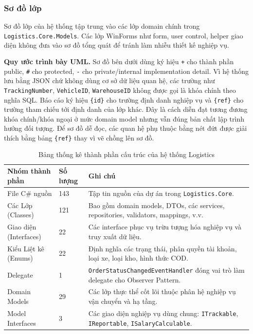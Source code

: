 \documentclass[12pt,a4paper]{article}
\begin{document}
\subsubsection{Sơ đồ lớp}

Sơ đồ lớp của hệ thống tập trung vào các lớp domain chính trong \texttt{Logistics.Core.Models}. Các lớp WinForms như form, user control, helper giao diện không đưa vào sơ đồ tổng quát để tránh làm nhiễu thiết kế nghiệp vụ.

\noindent\textbf{Quy ước trình bày UML.} Sơ đồ bên dưới dùng ký hiệu \texttt{+} cho thành phần public, \texttt{\#} cho protected, \texttt{-} cho private/internal implementation detail. Vì hệ thống lưu bằng JSON chứ không dùng cơ sở dữ liệu quan hệ, các trường như \texttt{TrackingNumber}, \texttt{VehicleID}, \texttt{WarehouseID} không được gọi là khóa chính theo nghĩa SQL. Báo cáo ký hiệu \texttt{\{id\}} cho trường định danh nghiệp vụ và \texttt{\{ref\}} cho trường tham chiếu tới định danh của lớp khác. Đây là cách diễn đạt tương đương khóa chính/khóa ngoại ở mức domain model nhưng vẫn đúng bản chất lập trình hướng đối tượng. Để sơ đồ dễ đọc, các quan hệ phụ thuộc bằng nét đứt được giải thích bằng bảng \texttt{\{ref\}} thay vì vẽ chồng lên sơ đồ.

\begin{table}[H]
\centering
\begin{tabular}{llp{8.5cm}}
\toprule
\textbf{Nhóm thành phần} & \textbf{Số lượng} & \textbf{Ghi chú} \\
\midrule
File C\# nguồn & 143 & Tập tin nguồn của dự án trong \texttt{Logistics.Core}. \\
Các Lớp (Classes) & 121 & Bao gồm domain models, DTOs, các services, repositories, validators, mappings, v.v. \\
Giao diện (Interfaces) & 22 & Các interface phục vụ trừu tượng hóa nghiệp vụ và truy xuất dữ liệu. \\
Kiểu Liệt kê (Enums) & 22 & Định nghĩa các trạng thái, phân quyền tài khoản, loại xe, loại kho, hình thức COD. \\
Delegate & 1 & \texttt{OrderStatusChangedEventHandler} đóng vai trò làm delegate cho Observer Pattern. \\
Domain Models & 29 & Các lớp thực thể cốt lõi thuộc phân hệ nghiệp vụ vận chuyển và hạ tầng. \\
Model Interfaces & 3 & Các giao diện nghiệp vụ dùng chung: \texttt{ITrackable}, \texttt{IReportable}, \texttt{ISalaryCalculable}. \\
\bottomrule
\end{tabular}
\caption{Bảng thống kê thành phần cấu trúc của hệ thống Logistics}
\end{table}
\end{document}
